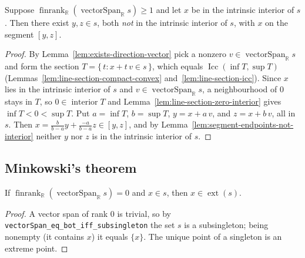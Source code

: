 \begin{lemma}
    \label{lem:interior-in-segment}
    \leanok
    Suppose $\operatorname{finrank}_{\mathbb R}(\operatorname{vectorSpan}_{\mathbb R} s) \ge 1$
    and let $x$ be in the intrinsic interior of $s$. Then there exist $y, z \in s$,
    both \emph{not} in the intrinsic interior of $s$, with $x$ on the segment
    $[y, z]$.
\end{lemma}
\begin{proof}
    By Lemma~\ref{lem:exists-direction-vector} pick a nonzero
    $v \in \operatorname{vectorSpan}_{\mathbb R} s$ and form the section
    $T = \{\, t : x + t\, v \in s \,\}$, which equals
    $\operatorname{Icc}(\inf T, \sup T)$
    (Lemmas~\ref{lem:line-section-compact-convex} and~\ref{lem:line-section-icc}).
    Since $x$ lies in the intrinsic interior of $s$ and
    $v \in \operatorname{vectorSpan}_{\mathbb R} s$, a neighbourhood of $0$ stays in
    $T$, so $0 \in \operatorname{interior} T$ and
    Lemma~\ref{lem:line-section-zero-interior} gives $\inf T < 0 < \sup T$. Put
    $a = \inf T$, $b = \sup T$, $y = x + a\, v$, and $z = x + b\, v$, all in $s$.
    Then $x = \tfrac{b}{b-a} y + \tfrac{-a}{b-a} z \in [y, z]$, and by
    Lemma~\ref{lem:segment-endpoints-not-interior} neither $y$ nor $z$ is in the
    intrinsic interior of $s$.
\end{proof}

\subsection{Minkowski's theorem}

\begin{lemma}
    \label{lem:base-case}
    \leanok
    If $\operatorname{finrank}_{\mathbb R}(\operatorname{vectorSpan}_{\mathbb R} s) = 0$
    and $x \in s$, then $x \in \operatorname{ext}(s)$.
\end{lemma}
\begin{proof}
    A vector span of rank $0$ is trivial, so by
    \texttt{vectorSpan\_eq\_bot\_iff\_subsingleton} the set $s$ is a subsingleton;
    being nonempty (it contains $x$) it equals $\{x\}$. The unique point of a
    singleton is an extreme point.
\end{proof}

